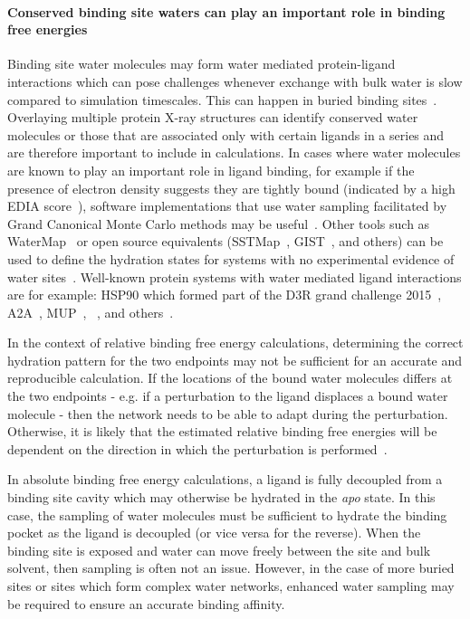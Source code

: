 \documentclass[9pt,bestpractices]{livecoms}
\begin{document}
\paragraph{Conserved binding site waters can play an important role in binding free energies}
Binding site water molecules may form water mediated protein-ligand interactions which can pose challenges whenever exchange with bulk water is slow compared to simulation timescales. This can happen in buried binding sites~\cite{laage2017water}. Overlaying multiple protein X-ray structures can identify conserved water molecules or those that are associated only with certain ligands in a series and are therefore important to include in calculations. In cases where water molecules are known to play an important role in ligand binding, for example if the presence of electron density suggests they are tightly bound (indicated by a high EDIA score~\cite{nittinger2015evidence,meyder2017estimating}), software implementations that use water sampling facilitated by Grand Canonical Monte Carlo methods may be useful~\cite{michel2010prediction}. Other tools such as WaterMap~\cite{abel2008role,young2007motifs} or open source equivalents (SSTMap~\cite{haider2018solvation}, GIST~\cite{ramsey2016solvation}, and others) can be used to define the hydration states for systems with no experimental evidence of water sites~\cite{wang2011ligand}. Well-known protein systems with water mediated ligand interactions are for example: HSP90 which formed part of the D3R grand challenge 2015~\cite{mey2016blinded}, A2A~\cite{brucemacdonald2018ligand}, MUP~\cite{ross2015water}, ~\cite{deflorian2020accurate}, and others~\cite{michel2009energetics}.

In the context of relative binding free energy calculations, determining the correct hydration pattern for the two endpoints may not be sufficient for an accurate and reproducible calculation. If the locations of the bound water molecules differs at the two endpoints - e.g. if a perturbation to the ligand displaces a bound water molecule - then the network needs to be able to adapt during the perturbation. Otherwise, it is likely that the estimated relative binding free energies will be dependent on the direction in which the perturbation is performed~\cite{ross2020enhancing}.

In absolute binding free energy calculations, a ligand is fully decoupled from a binding site cavity which may otherwise be hydrated in the \textit{apo} state. In this case, the sampling of water molecules must be sufficient to hydrate the binding pocket as the ligand is decoupled (or vice versa for the reverse). When the binding site is exposed and water can move freely between the site and bulk solvent, then sampling is often not an issue. However, in the case of more buried sites or sites which form complex water networks, enhanced water sampling may be required to ensure an accurate binding affinity.
\end{document}
